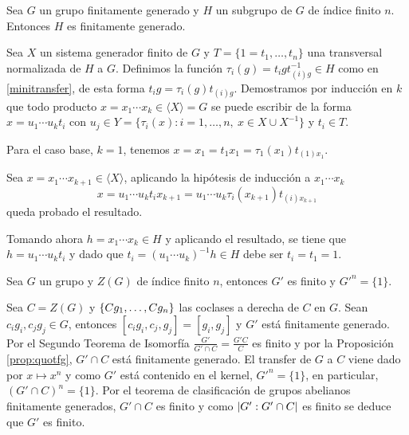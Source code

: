 \begin{proposicion}\label{prop:quotfg} %
	Sea $G$ un grupo finitamente generado y $H$ un subgrupo de $G$ de índice finito $n$. Entonces $H$ es finitamente generado.
	\begin{demostracion}
		Sea $X$ un sistema generador finito de $G$ y $T=\{1=t_1,\ldots,t_n\}$ una transversal normalizada de $H$ a $G$. Definimos la función $\tau_{i}(g) = t_igt_{(i)g}^{-1}\in H$ como en \eqref{minitransfer}, de esta forma $t_i g = \tau_{i}(g)t_{(i)g}$.
		Demostramos por inducción en $k$ que todo producto $x=x_1\cdots x_k\in \langle X \rangle = G$ se puede escribir de la forma $x=u_1\cdots u_k t_i$ con $u_j\in Y=\{\tau_i(x) : i=1,\ldots,n,\ x\in X\cup X^{-1}\}$ y $t_i\in T$. 
		
		Para el caso base, $k=1$, tenemos $x=x_1=t_1x_1 = \tau_1(x_1)t_{(1)x_1}$.
		
		Sea $x=x_1\cdots x_{k+1}\in \langle X \rangle$, aplicando la hipótesis de inducción a $x_1\cdots x_k$
		\begin{equation*}
			x=u_1\cdots u_k t_i x_{k+1} = u_1\cdots u_k \tau_i(x_{k+1}) t_{(i)x_{k+1}}
		\end{equation*}
		queda probado el resultado.
		
		Tomando ahora $h=x_1\cdots x_k \in H$ y aplicando el resultado, se tiene que $h=u_1\cdots u_k t_i$ y dado que $t_i = (u_1\cdots u_k)^{-1} h\in H$ debe ser $t_i=t_1=1$.
		
		
		
	
	\end{demostracion}
\end{proposicion}

\begin{corolario}[Schur]
	Sea $G$ un grupo y $Z(G)$ de índice finito $n$, entonces $G'$ es finito y $G'^n = \{1\}$.
	\begin{demostracion}
		Sea $C=Z(G)$ y $\{Cg_1,\ldots,Cg_n\}$ las coclases a derecha de $C$ en $G$. Sean $c_ig_i,c_jg_j\in G$, entonces $[c_ig_i,c_j,g_j] = [g_i,g_j]$ y $G'$ está finitamente generado. Por el Segundo Teorema de Isomorfía $\frac{G'}{G'\cap C} = \frac{G'C}{C}$ es finito y por la Proposición \ref{prop:quotfg}, $G'\cap C$ está finitamente generado.
		El transfer de $G$ a $C$ viene dado por $x\mapsto x^n$ y como $G'$ está contenido en el kernel, $G'^n = \{1\}$, en particular, $(G'\cap C)^n = \{1\}$. Por el teorema de clasificación de grupos abelianos finitamente generados, $G'\cap C$ es finito y como $\left|G':G'\cap C\right|$ es finito se deduce que $G'$ es finito.
	\end{demostracion}
\end{corolario}


